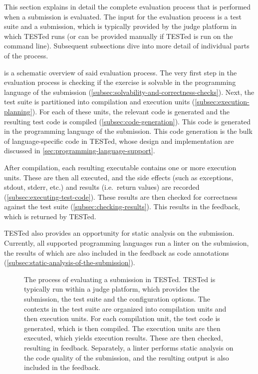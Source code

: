 \documentclass[../main]{subfiles}
\begin{document}
This section explains in detail the complete evaluation process that is performed when a submission is evaluated.
The input for the evaluation process is a test suite and a submission, which is typically provided by the judge platform in which TESTed runs (or can be provided manually if TESTed is run on the command line).
Subsequent subsections dive into more detail of individual parts of the process.

 is a schematic overview of said evaluation process.
The very first step in the evaluation process is checking if the exercise is solvable in the programming language of the submission (\cref{subsec:solvability-and-correctness-checks}).
Next, the test suite is partitioned into compilation and execution units (\cref{subsec:execution-planning}).
For each of these units, the relevant code is generated and the resulting test code is compiled (\cref{subsec:code-generation}).
This code is generated in the programming language of the submission.
This code generation is the bulk of language-specific code in TESTed, whose design and implementation are discussed in \vref{sec:programming-language-support}.

After compilation, each resulting executable contains one or more execution units.
These are then all executed, and the side effects (such as exceptions, stdout, stderr, etc.) and results (i.e.\ return values) are recorded (\cref{subsec:executing-test-code}).
These results are then checked for correctness against the test suite (\cref{subsec:checking-results}).
This results in the feedback, which is returned by TESTed.

TESTed also provides an opportunity for static analysis on the submission.
Currently, all supported programming languages run a linter on the submission, the results of which are also included in the feedback as code annotations (\cref{subsec:static-analysis-of-the-submission}).

\begin{figure}
    \centering
    
    \caption{
        The process of evaluating a submission in TESTed.
        TESTed is typically run within a judge platform, which provides the submission, the test suite and the configuration options.
        The contexts in the test suite are organized into compilation units and then execution units.
        For each compilation unit, the test code is generated, which is then compiled.
        The execution units are then executed, which yields execution results. These are then checked, resulting in feedback.
        Separately, a linter performs static analysis on the code quality of the submission, and the resulting output is also included in the feedback.
    }
    \label{fig:flow}
\end{figure}
\end{document}
